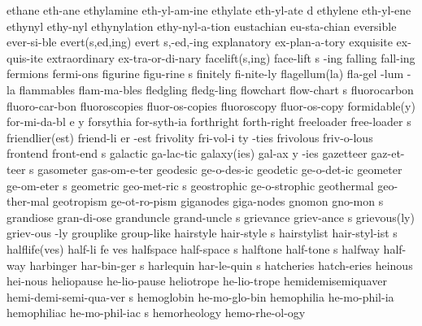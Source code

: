 \1 ethane		eth-ane			%
\1 ethylamine		eth-yl-am-ine		%
\5 ethylate		eth-yl-ate d		%
\1 ethylene		eth-yl-ene
\1 ethynyl		ethy-nyl		%
\1 ethynylation		ethy-nyl-a-tion		%
\1 eustachian		eu-sta-chian		%
\1 eversible		ever-si-ble
\2 evert(s,ed,ing)	evert s,-ed,-ing
\1 explanatory		ex-plan-a-tory		%
\1 exquisite		ex-quis-ite
\1 extraordinary	ex-tra-or-di-nary
\3 facelift(s,ing)	face-lift s -ing	%
\1 falling		fall-ing		%
\1 fermions		fermi-ons
\5 figurine		figu-rine s		%
\1 finitely		fi-nite-ly		%
\3 flagellum(la)	fla-gel -lum -la
\1 flammables		flam-ma-bles
\1 fledgling		fledg-ling
\5 flowchart		flow-chart s
\1 fluorocarbon		fluoro-car-bon		%
\1 fluoroscopies	fluor-os-copies 	%
\1 fluoroscopy		fluor-os-copy	 	%
\3 formidable(y)	for-mi-da-bl e y
\1 forsythia		for-syth-ia
\1 forthright		forth-right
\5 freeloader		free-loader s
\3 friendlier(est)	friend-li er -est
\6 frivolity		fri-vol-i ty -ties
\1 frivolous		friv-o-lous
\5 frontend		front-end s		%
\1 galactic		ga-lac-tic
\3 galaxy(ies)		gal-ax y -ies
\5 gazetteer		gaz-et-teer s		%
\1 gasometer		gas-om-e-ter
\1 geodesic		ge-o-des-ic
\1 geodetic		ge-o-det-ic		%
\5 geometer		ge-om-eter s		%
\5 geometric		geo-met-ric s
\1 geostrophic          ge-o-strophic		%
\1 geothermal		geo-ther-mal		%
\1 geotropism		ge-ot-ro-pism
\NewWordtrue
\1 giganodes		giga-nodes		%
\5 gnomon		gno-mon s
\1 grandiose		gran-di-ose		%
\5 granduncle		grand-uncle s		%
\5 grievance		griev-ance s
\2 grievous(ly) 	griev-ous -ly
\1 grouplike		group-like
\5 hairstyle		hair-style s
\5 hairstylist		hair-styl-ist s
\3 halflife(ves)	half-li fe ves		%
\5 halfspace		half-space s            %
\5 halftone		half-tone s		%
\1 halfway		half-way		%
\5 harbinger		har-bin-ger s
\5 harlequin		har-le-quin s
\1 hatcheries		hatch-eries
\1 heinous		hei-nous		%
\1 heliopause		he-lio-pause		%
\1 heliotrope		he-lio-trope		%
\5 hemidemisemiquaver	hemi-demi-semi-qua-ver s	%
\1 hemoglobin		he-mo-glo-bin
\1 hemophilia		he-mo-phil-ia
\5 hemophiliac		he-mo-phil-iac s	%
\1 hemorheology 	hemo-rhe-ol-ogy

